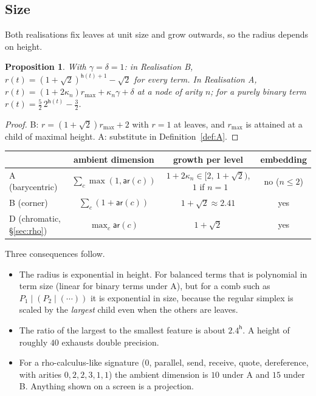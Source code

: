 \documentclass[11pt]{article}
\newtheorem{proposition}[theorem]{Proposition}
\theoremstyle{definition}
\theoremstyle{remark}
\newcommand{\ar}{\mathsf{ar}}
\newcommand{\rad}{r}
\newcommand{\hgt}{\mathsf{h}}
\begin{document}
\subsection{Size}

Both realisations fix leaves at unit size and grow outwards, so the radius
depends on height.

\begin{proposition}\label{prop:size}
With $\gamma=\delta=1$: in Realisation B,
$\rad(t)=(1+\sqrt2)^{\hgt(t)+1}-\sqrt2$ for every term. In Realisation A,
$\rad(t)=(1+2\kappa_n)\rad_{\max}+\kappa_n\gamma+\delta$ at a node of arity $n$;
for a purely binary term $\rad(t)=\tfrac52\,2^{\hgt(t)}-\tfrac32$.
\end{proposition}
\begin{proof}
B: $\rad=(1+\sqrt2)\rad_{\max}+2$ with $\rad=1$ at leaves, and $\rad_{\max}$
is attained at a child of maximal height. A: substitute in
Definition~\ref{def:A}.
\end{proof}

\begin{center}
\begin{tabular}{lccc}
\toprule
 & ambient dimension & growth per level & embedding \\
\midrule
A (barycentric) & $\sum_c\max(1,\ar(c))$ & $1+2\kappa_n\in[2,\,1+\sqrt2)$, \ $1$ if $n=1$ & no ($n\le2$) \\
B (corner) & $\sum_c(1+\ar(c))$ & $1+\sqrt2\approx2.41$ & yes \\
D (chromatic, \S\ref{sec:rho}) & $\max_c\ar(c)$ & $1+\sqrt2$ & yes \\
\bottomrule
\end{tabular}
\end{center}

Three consequences follow.
\begin{itemize}
\item The radius is exponential in height. For balanced terms that is polynomial
in term size (linear for binary terms under A), but for a comb such as
$P_1\mid(P_2\mid(\cdots))$ it is exponential in size, because the regular simplex
is scaled by the \emph{largest} child even when the others are leaves.
\item The ratio of the largest to the smallest feature is about $2.4^{\hgt}$. A
height of roughly $40$ exhausts double precision.
\item For a rho-calculus-like signature ($0$, parallel, send, receive, quote,
dereference, with arities $0,2,2,3,1,1$) the ambient dimension is $10$ under A
and $15$ under B. Anything shown on a screen is a projection.
\end{itemize}
\end{document}
